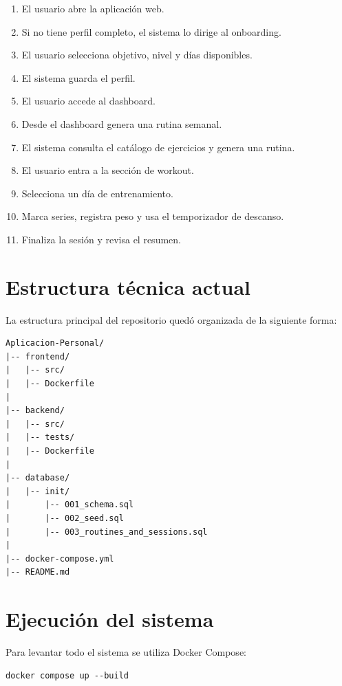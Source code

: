 \documentclass[12pt,a4paper]{article}
\begin{document}
\begin{enumerate}
    \item El usuario abre la aplicación web.
    \item Si no tiene perfil completo, el sistema lo dirige al onboarding.
    \item El usuario selecciona objetivo, nivel y días disponibles.
    \item El sistema guarda el perfil.
    \item El usuario accede al dashboard.
    \item Desde el dashboard genera una rutina semanal.
    \item El sistema consulta el catálogo de ejercicios y genera una rutina.
    \item El usuario entra a la sección de workout.
    \item Selecciona un día de entrenamiento.
    \item Marca series, registra peso y usa el temporizador de descanso.
    \item Finaliza la sesión y revisa el resumen.
\end{enumerate}

\section{Estructura técnica actual}

La estructura principal del repositorio quedó organizada de la siguiente forma:

\begin{lstlisting}
Aplicacion-Personal/
|-- frontend/
|   |-- src/
|   |-- Dockerfile
|
|-- backend/
|   |-- src/
|   |-- tests/
|   |-- Dockerfile
|
|-- database/
|   |-- init/
|       |-- 001_schema.sql
|       |-- 002_seed.sql
|       |-- 003_routines_and_sessions.sql
|
|-- docker-compose.yml
|-- README.md
\end{lstlisting}

\section{Ejecución del sistema}

Para levantar todo el sistema se utiliza Docker Compose:

\begin{lstlisting}
docker compose up --build
\end{lstlisting}
\end{document}
